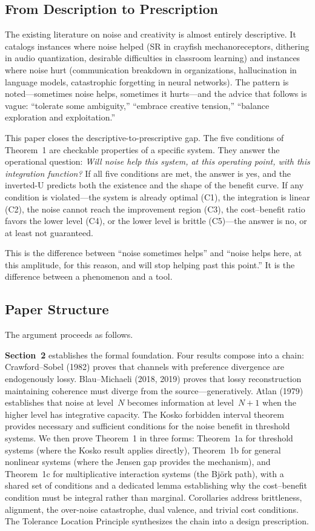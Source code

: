 \documentclass[12pt,letterpaper]{article}
\theoremstyle{definition}
\theoremstyle{remark}
\begin{document}
\subsection{From Description to Prescription}

The existing literature on noise and creativity is almost entirely descriptive. It catalogs instances where noise helped (SR in crayfish mechanoreceptors, dithering in audio quantization, desirable difficulties in classroom learning) and instances where noise hurt (communication breakdown in organizations, hallucination in language models, catastrophic forgetting in neural networks). The pattern is noted---sometimes noise helps, sometimes it hurts---and the advice that follows is vague: ``tolerate some ambiguity,'' ``embrace creative tension,'' ``balance exploration and exploitation.''

This paper closes the descriptive-to-prescriptive gap. The five conditions of Theorem~1 are checkable properties of a specific system. They answer the operational question: \emph{Will noise help this system, at this operating point, with this integration function?} If all five conditions are met, the answer is yes, and the inverted-U predicts both the existence and the shape of the benefit curve. If any condition is violated---the system is already optimal (C1), the integration is linear (C2), the noise cannot reach the improvement region (C3), the cost--benefit ratio favors the lower level (C4), or the lower level is brittle (C5)---the answer is no, or at least not guaranteed.

This is the difference between ``noise sometimes helps'' and ``noise helps here, at this amplitude, for this reason, and will stop helping past this point.'' It is the difference between a phenomenon and a tool.


\subsection{Paper Structure}

The argument proceeds as follows.

\textbf{Section~2} establishes the formal foundation. Four results compose into a chain: Crawford--Sobel (1982) proves that channels with preference divergence are endogenously lossy. Blau--Michaeli (2018, 2019) proves that lossy reconstruction maintaining coherence must diverge from the source---generatively. Atlan (1979) establishes that noise at level~$N$ becomes information at level~$N{+}1$ when the higher level has integrative capacity. The Kosko forbidden interval theorem provides necessary and sufficient conditions for the noise benefit in threshold systems. We then prove Theorem~1 in three forms: Theorem~1a for threshold systems (where the Kosko result applies directly), Theorem~1b for general nonlinear systems (where the Jensen gap provides the mechanism), and Theorem~1c for multiplicative interaction systems (the Bj{\"o}rk path), with a shared set of conditions and a dedicated lemma establishing why the cost--benefit condition must be integral rather than marginal. Corollaries address brittleness, alignment, the over-noise catastrophe, dual valence, and trivial cost conditions. The Tolerance Location Principle synthesizes the chain into a design prescription.
\end{document}
